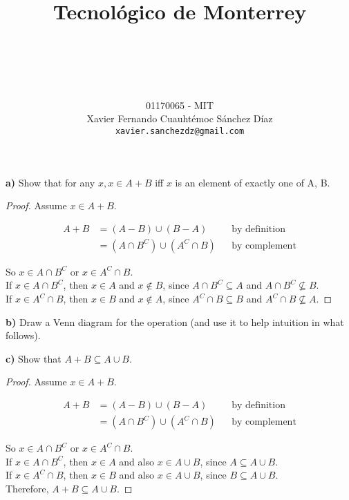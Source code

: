 \documentclass[titlepage, letterpaper, fleqn]{article}
\title{
\vspace{1in}
\textbf{Tecnológico de Monterrey} \\
\vspace{0.5in}
\textmd{\mahclass} \\
\large{\textit{\mahteacher}} \\
\vspace{0.5in}
\textsc{\mahtitle}
\author{01170065  - MIT \\
Xavier Fernando Cuauhtémoc Sánchez Díaz \\
\texttt{xavier.sanchezdz@gmail.com}}
\date{\mahdate}
}
\newcommand{\spacepls}{\vspace{5mm}}
\def\firstcircle{(0,0) circle (1.5cm)}
\def\secondcircle{(0:2cm) circle (1.5cm)}
\begin{document}
\begin{titlepage}
\maketitle
\end{titlepage}

%
%

{\large \textbf{a)} Show that for any \(x, x \in A + B\) iff \(x\) is an element of exactly one of A, B.}

\begin{proof}
  Assume \(x \in A + B\).

  \begin{align*}
  A + B &= (A-B) \cup (B-A)     &&\text{by definition}
  \\ &= (A \cap B^C) \cup (A^C \cap B)  &&\text{by complement}
  \end{align*}

  So \(x \in A \cap B^C\) or \(x \in A^C \cap B\). \\
  If \(x \in A \cap B^C\), then \(x \in A\) and \(x \not \in B\), since \(A \cap B^C \subseteq A\) and \(A \cap B^C \not \subseteq B\). \\
  If \(x \in A^C \cap B\), then \(x \in B\) and \(x \not \in A\), since \(A^C \cap B \subseteq B\) and \(A^C \cap B \not \subseteq A\).
\end{proof}

\spacepls

{\large \textbf{b)} Draw a Venn diagram for the operation (and use it to help intuition in what follows).}

\spacepls


\spacepls

{\large \textbf{c)} Show that \(A + B \subseteq A \cup B\).}

\begin{proof}
	Assume \(x \in A + B\).

  \begin{align*}
  A + B &= (A-B) \cup (B-A)     &&\text{by definition}
  \\ &= (A \cap B^C) \cup (A^C \cap B)  &&\text{by complement}
  \end{align*}

  So \(x \in A \cap B^C\) or \(x \in A^C \cap B\). \\
  If \(x \in A \cap B^C\), then \(x \in A\) and also \(x \in A \cup B\), since \(A \subseteq A \cup B\). \\
  If \(x \in A^C \cap B\), then \(x \in B\) and also \(x \in A \cup B\), since \(B \subseteq A \cup B\). \\
  Therefore, \(A + B \subseteq A \cup B\).
\end{proof}
\end{document}
